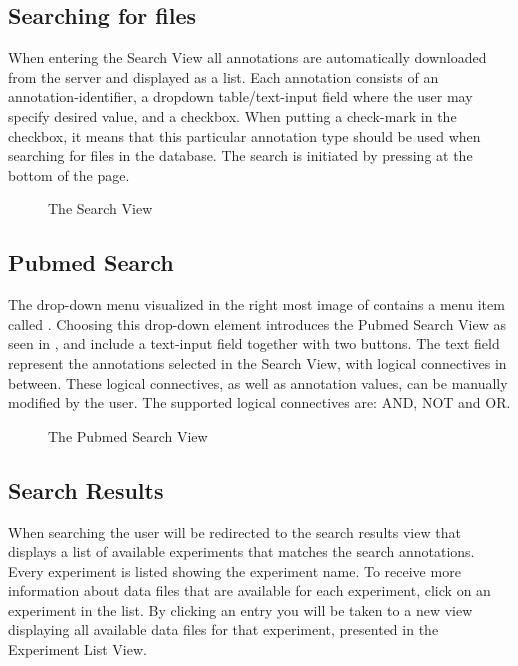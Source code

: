 \subsection{Searching for files}\label{sec:and_search}

When entering the Search View all annotations are automatically downloaded from the server and displayed as a list. Each annotation consists of an annotation-identifier, a dropdown table/text-input field where the user may specify desired value, and a checkbox. When putting a check-mark in the checkbox, it means that this particular annotation type should be used when searching for files in the database. The search is initiated by pressing  at the bottom of the
page.

\begin{figure}[h]
\caption{The Search View}
\label{fig:and_search_man}
\end{figure}
\FloatBarrier

\subsection{Pubmed Search}
The drop-down menu visualized in the right most image of
 contains a menu item called . Choosing this drop-down element introduces the Pubmed Search View as
seen in , and include a text-input field together with two
buttons. The text field represent the annotations selected in the Search View,
with logical connectives in between. These logical connectives, as well as
annotation values, can be manually modified by the user. The supported logical
connectives are: AND, NOT and OR.

\begin{figure}[h]
\caption{The Pubmed Search View}
\label{fig:and_pubmed_man} 
\end{figure}
\FloatBarrier


\subsection{Search Results}
When searching the user will be redirected to the search results view  that displays a list of available experiments that matches the search annotations. Every experiment is listed showing the experiment name. To receive more information about data files that are available for each experiment, click on an experiment in the list. By clicking an entry you will be taken to a new view displaying all available data files for that experiment, presented in the Experiment List View. 


